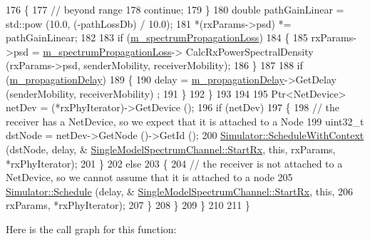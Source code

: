 \begin{DoxyCode}
176                 \{
177                   \textcolor{comment}{// beyond range}
178                   \textcolor{keywordflow}{continue};
179                 \}
180               \textcolor{keywordtype}{double} pathGainLinear = std::pow (10.0, (-pathLossDb) / 10.0);
181               *(rxParams->psd) *= pathGainLinear;              
182 
183               \textcolor{keywordflow}{if} (\hyperlink{classns3_1_1SingleModelSpectrumChannel_adc3d2a753657da18986c30751e3f79f4}{m\_spectrumPropagationLoss})
184                 \{
185                   rxParams->psd = \hyperlink{classns3_1_1SingleModelSpectrumChannel_adc3d2a753657da18986c30751e3f79f4}{m\_spectrumPropagationLoss}->
      CalcRxPowerSpectralDensity (rxParams->psd, senderMobility, receiverMobility);
186                 \}
187 
188               \textcolor{keywordflow}{if} (\hyperlink{classns3_1_1SingleModelSpectrumChannel_a7149d0ddac473b3d83969ad6445a2cc6}{m\_propagationDelay})
189                 \{
190                   delay = \hyperlink{classns3_1_1SingleModelSpectrumChannel_a7149d0ddac473b3d83969ad6445a2cc6}{m\_propagationDelay}->GetDelay (senderMobility, receiverMobility)
      ;
191                 \}
192             \}
193 
194 
195           Ptr<NetDevice> netDev = (*rxPhyIterator)->GetDevice ();
196           \textcolor{keywordflow}{if} (netDev)
197             \{
198               \textcolor{comment}{// the receiver has a NetDevice, so we expect that it is attached to a Node}
199               uint32\_t dstNode =  netDev->GetNode ()->GetId ();
200               \hyperlink{classns3_1_1Simulator_a86dbaef45a15a42365d7d2ae550449f6}{Simulator::ScheduleWithContext} (dstNode, delay, &
      \hyperlink{classns3_1_1SingleModelSpectrumChannel_acbb96418c262802f209fc69eb16573df}{SingleModelSpectrumChannel::StartRx}, \textcolor{keyword}{this}, rxParams, *rxPhyIterator);
201             \}
202           \textcolor{keywordflow}{else}
203             \{
204               \textcolor{comment}{// the receiver is not attached to a NetDevice, so we cannot assume that it is attached to a
       node}
205               \hyperlink{classns3_1_1Simulator_a671882c894a08af4a5e91181bf1eec13}{Simulator::Schedule} (delay, &
      \hyperlink{classns3_1_1SingleModelSpectrumChannel_acbb96418c262802f209fc69eb16573df}{SingleModelSpectrumChannel::StartRx}, \textcolor{keyword}{this},
206                                    rxParams, *rxPhyIterator);
207             \}
208         \}
209     \}
210 
211 \}
\end{DoxyCode}


Here is the call graph for this function\+:




